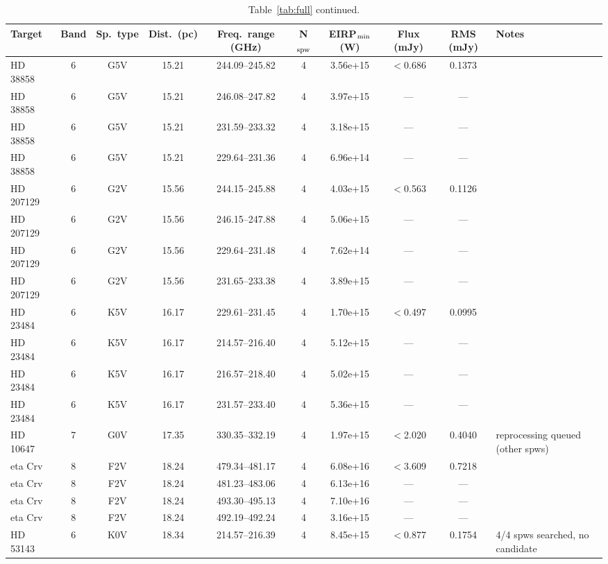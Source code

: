 \documentclass{openjournal}
\begin{document}
\begin{table}
\centering
\scriptsize
\caption{Table~\ref{tab:full} continued.}
\label{tab:full4}
\begin{tabularx}{\textwidth}{@{}l c c c c c c c c X@{}}
\hline
Target & Band & Sp.\ type & Dist.\ (pc) & Freq.\ range (GHz) & N$_{\rm spw}$ & EIRP$_{\rm min}$ (W) & Flux (mJy) & RMS (mJy) & Notes \\
\hline
HD 38858 & 6 & G5V & 15.21 & 244.09--245.82 & 4 & 3.56e+15 & $<$0.686 & 0.1373 &  \\
HD 38858 & 6 & G5V & 15.21 & 246.08--247.82 & 4 & 3.97e+15 & --- & --- &  \\
HD 38858 & 6 & G5V & 15.21 & 231.59--233.32 & 4 & 3.18e+15 & --- & --- &  \\
HD 38858 & 6 & G5V & 15.21 & 229.64--231.36 & 4 & 6.96e+14 & --- & --- &  \\
HD 207129 & 6 & G2V & 15.56 & 244.15--245.88 & 4 & 4.03e+15 & $<$0.563 & 0.1126 &  \\
HD 207129 & 6 & G2V & 15.56 & 246.15--247.88 & 4 & 5.06e+15 & --- & --- &  \\
HD 207129 & 6 & G2V & 15.56 & 229.64--231.48 & 4 & 7.62e+14 & --- & --- &  \\
HD 207129 & 6 & G2V & 15.56 & 231.65--233.38 & 4 & 3.89e+15 & --- & --- &  \\
HD 23484 & 6 & K5V & 16.17 & 229.61--231.45 & 4 & 1.70e+15 & $<$0.497 & 0.0995 &  \\
HD 23484 & 6 & K5V & 16.17 & 214.57--216.40 & 4 & 5.12e+15 & --- & --- &  \\
HD 23484 & 6 & K5V & 16.17 & 216.57--218.40 & 4 & 5.02e+15 & --- & --- &  \\
HD 23484 & 6 & K5V & 16.17 & 231.57--233.40 & 4 & 5.36e+15 & --- & --- &  \\
HD 10647 & 7 & G0V & 17.35 & 330.35--332.19 & 4 & 1.97e+15 & $<$2.020 & 0.4040 & reprocessing queued (other spws) \\
eta Crv & 8 & F2V & 18.24 & 479.34--481.17 & 4 & 6.08e+16 & $<$3.609 & 0.7218 &  \\
eta Crv & 8 & F2V & 18.24 & 481.23--483.06 & 4 & 6.13e+16 & --- & --- &  \\
eta Crv & 8 & F2V & 18.24 & 493.30--495.13 & 4 & 7.10e+16 & --- & --- &  \\
eta Crv & 8 & F2V & 18.24 & 492.19--492.24 & 4 & 3.16e+15 & --- & --- &  \\
HD 53143 & 6 & K0V & 18.34 & 214.57--216.39 & 4 & 8.45e+15 & $<$0.877 & 0.1754 & 4/4 spws searched, no candidate \\

\end{tabularx}
\end{table}
\end{document}
